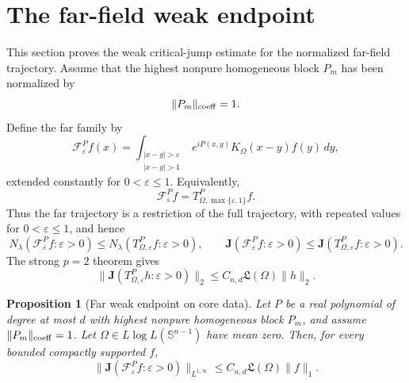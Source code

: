 \documentclass[11pt]{article}
\numberwithin{equation}{section}
\newtheorem{proposition}[theorem]{Proposition}
\theoremstyle{remark}
\theoremstyle{definition}
\newcommand{\Sph}{\mathbb S}
\newcommand{\cF}{\mathcal F}
\newcommand{\norm}[1]{\lVert #1\rVert}
\begin{document}
\section{The far-field weak endpoint}
\label{sec:weak-far}

This section proves the weak critical-jump estimate for the normalized
far-field trajectory.  Assume that the highest nonpure homogeneous block
$P_m$ has been
normalized by
\begin{equation}\label{eq:top-block-normalized}
 \norm{P_m}_{\rm coeff}=1.
\end{equation}
Define the far family by
\[
 \cF^P_\varepsilon f(x)=
 \int_{\substack{|x-y|>\varepsilon\\|x-y|>1}}
 e^{iP(x,y)}K_\Omega(x-y)f(y)\,dy,
\]
extended constantly for $0<\varepsilon\le1$.  Equivalently,
\begin{equation}\label{eq:far-as-full-restriction}
 \cF^P_\varepsilon f
 =T^P_{\Omega,\max\{\varepsilon,1\}}f.
\end{equation}
Thus the far trajectory is a restriction of the full trajectory, with
repeated values for $0<\varepsilon\le1$, and hence
\begin{equation}\label{eq:far-jump-domination}
 N_\lambda(\cF^P_\varepsilon f:\varepsilon>0)
 \le N_\lambda(T^P_{\Omega,\varepsilon}f:\varepsilon>0),
 \qquad
 \mathbf J(\cF^P_\varepsilon f:\varepsilon>0)
 \le\mathbf J(T^P_{\Omega,\varepsilon}f:\varepsilon>0).
\end{equation}
The strong $p=2$ theorem gives
\begin{equation}\label{eq:L2jump}
 \norm{\mathbf J(T^P_{\Omega,\varepsilon}h:\varepsilon>0)}_2
 \le C_{n,d}\mathfrak L(\Omega)\norm h_2.
\end{equation}

\begin{proposition}[Far weak endpoint on core data]
\label{prop:farweak}
Let $P$ be a real polynomial of degree at most $d$ with highest nonpure
homogeneous block $P_m$, and assume
$\norm{P_m}_{\rm coeff}=1$.  Let
$\Omega\in L\log L(\Sph^{n-1})$ have mean zero.  Then, for every bounded
compactly supported $f$,
\begin{equation}\label{eq:farweak}
 \norm{\mathbf J(\cF^P_\varepsilon f:\varepsilon>0)}_{L^{1,\infty}}
 \le C_{n,d}\mathfrak L(\Omega)\norm f_1.
\end{equation}
\end{proposition}
\end{document}

